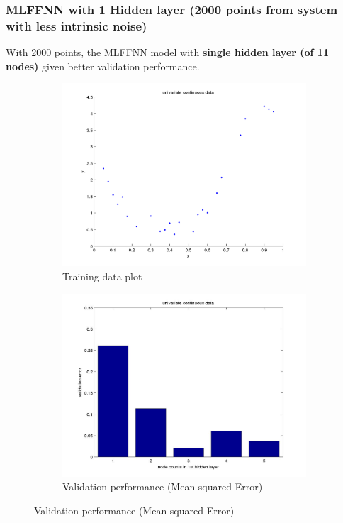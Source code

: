 \documentclass[fleqn]{article}
\begin{document}
\subsubsection{MLFFNN with 1 Hidden layer (2000 points from system with less intrinsic noise)}

With 2000 points, the MLFFNN model with \textbf{single hidden layer (of 11 nodes)} given better validation performance.


\begin{figure}[!ht]
\begin{subfigure}{.5\textwidth}
  \caption{Training data plot}
\includegraphics[scale=0.5]{pics/univariate/dataPlot}
\end{subfigure}
\begin{subfigure}{.5\textwidth}
\caption{Validation performance (Mean squared Error)}
\includegraphics[scale=0.2]{pics/univariate/univariate continuous data_validationerror}
\end{subfigure}
\end{figure}
\end{document}

